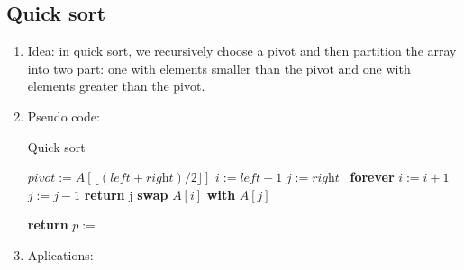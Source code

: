 \documentclass[12pt]{article}
\begin{document}
    \subsection{Quick sort}
    \begin{enumerate}
        \item Idea: in quick sort, we recursively choose a pivot and then partition the array into two part: one with elements smaller than the pivot and one with elements greater than the pivot.
        \item Pseudo code:
        \begin{algorithm}[H]
            \caption{Quick sort}
            \begin{algorithmic}[1]
                    \State $\textit{pivot}:=A[\lfloor (\textit{left}+\textit{right})/2\rfloor]$
                    \State $i:=\textit{left}-1$
                    \State $j:=\textit{right}$
                    \Loop\ \textbf{forever}
                    \Do
                        \State $i:=i+1$
                    \Do
                        \State $j:=j-1$
                        \State \textbf{return} j
                    \EndIf
                    \State \textbf{swap} $A[i]$ \textbf{with} $A[j]$
                    \EndLoop
                \EndFunction
            \end{algorithmic}
        \end{algorithm}
        \begin{algorithm}[H]
            \begin{algorithmic}[1]
                        \State \textbf{return}
                    \EndIf
                    \State $p:=$\ 
                    \State {}
                    \State {}
                \EndFunction
            \end{algorithmic}
        \end{algorithm}
        \item Aplications:
        \begin{itemize}

\end{itemize}
\end{enumerate}
\end{document}

